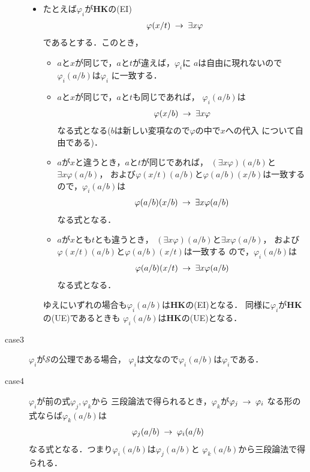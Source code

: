 \begin{metaprf}
\begin{description}
\begin{itemize}
					\item たとえば$\varphi_{i}$が{\bf HK}の(EI)
						\begin{align}
							\varphi(x/t) \hspace{0.25em}\rightarrow\hspace{0.25em} \exists x \varphi
						\end{align}
						であるとする．このとき，
						\begin{itemize}
							\item $a$と$x$が同じで，$a$と$t$が違えば，$\varphi_{i}$に
								$a$は自由に現れないので$\varphi_{i}(a/b)$は$\varphi_{i}$
								に一致する．
								
							\item $a$と$x$が同じで，$a$と$t$も同じであれば，
								$\varphi_{i}(a/b)$は
								\begin{align}
									\varphi(x/b) \hspace{0.25em}\rightarrow\hspace{0.25em} \exists x \varphi
								\end{align}
								なる式となる($b$は新しい変項なので$\varphi$の中で$x$への代入
								について自由である)．
								
							\item $a$が$x$と違うとき，$a$と$t$が同じであれば，
								$(\exists x \varphi)(a/b)$と$\exists x \varphi(a/b)$，
								および$\varphi(x/t)(a/b)$と$\varphi(a/b)(x/b)$は一致する
								ので，$\varphi_{i}(a/b)$は
								\begin{align}
									\varphi(a/b)(x/b) \hspace{0.25em}\rightarrow\hspace{0.25em} \exists x \varphi(a/b)
								\end{align}
								なる式となる．
							
							\item $a$が$x$とも$t$とも違うとき，
								$(\exists x \varphi)(a/b)$と$\exists x \varphi(a/b)$，
								および$\varphi(x/t)(a/b)$と$\varphi(a/b)(x/t)$は一致する
								ので，$\varphi_{i}(a/b)$は
								\begin{align}
									\varphi(a/b)(x/t) \hspace{0.25em}\rightarrow\hspace{0.25em} \exists x \varphi(a/b)
								\end{align}
								なる式となる．
						\end{itemize}		
						ゆえにいずれの場合も$\varphi_{i}(a/b)$は{\bf HK}の(EI)となる．
						同様に$\varphi_{i}$が{\bf HK}の(UE)であるときも
						$\varphi_{i}(a/b)$は{\bf HK}の(UE)となる．
				\end{itemize}
				
			\item[case3] $\varphi_{i}$が$\mathscr{S}$の公理である場合，
				$\varphi_{i}$は文なので$\varphi_{i}(a/b)$は$\varphi_{i}$である．
			
			\item[case4] $\varphi_{i}$が前の式$\varphi_{j},\varphi_{k}$から
				三段論法で得られるとき，$\varphi_{k}$が$\varphi_{j} \hspace{0.25em}\rightarrow\hspace{0.25em} \varphi_{i}$
				なる形の式ならば$\varphi_{k}(a/b)$は
				\begin{align}
					\varphi_{j}(a/b) \hspace{0.25em}\rightarrow\hspace{0.25em} \varphi_{i}(a/b)
				\end{align}
				なる式となる．つまり$\varphi_{i}(a/b)$は$\varphi_{j}(a/b)$と
				$\varphi_{k}(a/b)$から三段論法で得られる．
				

\end{description}
\end{metaprf}
